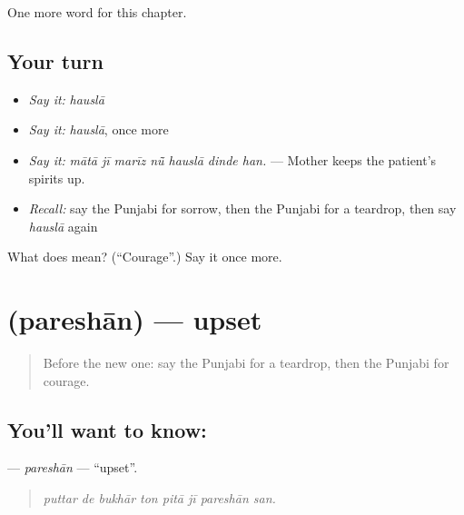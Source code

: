 \begin{grammarlens}[title={What you've built}]
One more word for this chapter.
\end{grammarlens}

\subsection*{Your turn}
\begin{itemize}
\raggedright
  \item \emph{Say it:} \emph{hauslā}
  \item \emph{Say it:} \emph{hauslā}, once more
  \item \emph{Say it:} \emph{mātā jī marīz nū̃ hauslā dinde han.} — Mother keeps the patient's spirits up.
  \item \emph{Recall:} say the Punjabi for sorrow, then the Punjabi for a teardrop, then say \emph{hauslā} again
\end{itemize}

\begin{tcolorbox}[breakable,colback=teal!4,colframe=teal!35!black,title={Before you move on}]
What does  mean? (\textquotedblleft{}Courage\textquotedblright{}.) Say it once more.
\end{tcolorbox}
\section[\texorpdfstring{\pa{ਪਰੇਸ਼ਾਨ} (pareshān)}{ਪਰੇਸ਼ਾਨ (pareshān)}]{ (pareshān) — upset}

\label{lesson:PA-C328-pareshan}



\begin{quote}
Before the new one: say the Punjabi for a teardrop, then the Punjabi for courage.
\end{quote}

\subsection*{You'll want to know: }
\textbf{} — \emph{pareshān} — \textquotedblleft{}upset\textquotedblright{}.

\begin{quote}
       
\end{quote}

\begin{quote}
\emph{puttar de bukhār ton pitā jī pareshān san.}
\end{quote}

